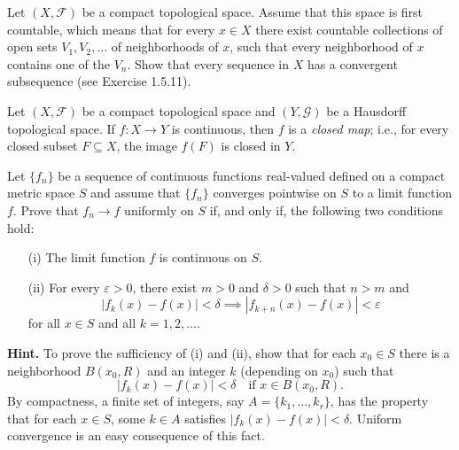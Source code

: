 \begin{problem}[15pts]
    Let $(X, \mathcal{F})$ be a compact topological space.  
Assume that this space is first countable, which means that for every $x \in X$ there exist countable collections of open sets $V_1, V_2, \ldots$ of neighborhoods of $x$, such that every neighborhood of $x$ contains one of the $V_n$.  
Show that every sequence in $X$ has a convergent subsequence
 (see Exercise 1.5.11).
\end{problem}
\begin{problem}[15pts]
    Let $(X,\mathcal{F})$ be a compact topological space and $(Y,\mathcal{G})$ be a Hausdorff topological space. 
If $f:X\to Y$ is continuous, then $f$ is a \emph{closed map}; i.e., for every closed
subset $F\subseteq X$, the image $f(F)$ is closed in $Y$.
\end{problem}
\begin{problem}[20pts]
    Let $\{f_n\}$ be a sequence of continuous functions real-valued defined on a compact metric space $S$ and assume that $\{f_n\}$ converges pointwise on $S$ to a limit function $f$.  
Prove that $f_n \to f$ uniformly on $S$ if, and only if, the following two conditions hold:

\begin{enumerate}
  \item[(i)] The limit function $f$ is continuous on $S$.
  \item[(ii)] For every $\varepsilon > 0$, there exist $m > 0$ and $\delta > 0$ such that $n > m$ and 
  \[
  |f_k(x) - f(x)| < \delta \implies |f_{k+n}(x) - f(x)| < \varepsilon
  \]
  for all $x \in S$ and all $k = 1, 2, \dots$.
\end{enumerate}

\noindent\textbf{Hint.} To prove the sufficiency of (i) and (ii), show that for each $x_0 \in S$ there is a neighborhood $B(x_0, R)$ and an integer $k$ (depending on $x_0$) such that
\[
|f_k(x) - f(x)| < \delta \quad \text{if } x \in B(x_0,R).
\]
By compactness, a finite set of integers, say $A = \{k_1, \dots, k_r\}$, has the property that for each $x \in S$, some $k \in A$ satisfies $|f_k(x) - f(x)| < \delta$.  
Uniform convergence is an easy consequence of this fact.
\end{problem}

